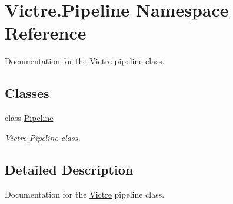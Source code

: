 \hypertarget{namespaceVictre_1_1Pipeline}{\section{Victre.\-Pipeline Namespace Reference}
\label{namespaceVictre_1_1Pipeline}
}


Documentation for the \hyperlink{namespaceVictre}{Victre} pipeline class.  


\subsection*{Classes}
\begin{DoxyCompactItemize}
\item 
class \hyperlink{classVictre_1_1Pipeline_1_1Pipeline}{Pipeline}
\begin{DoxyCompactList}\small\item\em \hyperlink{namespaceVictre}{Victre} \hyperlink{classVictre_1_1Pipeline_1_1Pipeline}{Pipeline} class. \end{DoxyCompactList}\end{DoxyCompactItemize}


\subsection{Detailed Description}
Documentation for the \hyperlink{namespaceVictre}{Victre} pipeline class. 